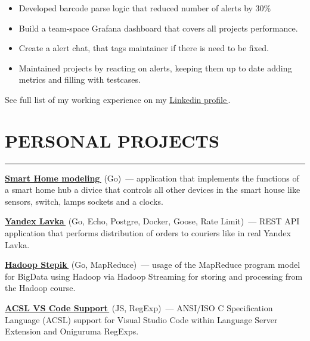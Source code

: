 \documentclass[11pt]{res} %
\let\orighref\href
\renewcommand{\href}[2]{\orighref{#1}{#2\,\faExternalLink}}
\begin{document}
\begin{resume}
        \begin{itemize} \itemsep -2pt
            \item Developed barcode parse logic that reduced number of alerts by 30\%
            \item Build a team-space Grafana dashboard that covers all projects performance.
            \item Create a alert chat, that tags maintainer if there is need to be fixed.  
            \item Maintained projects by reacting on alerts, keeping them up to date adding metrics and filling with testcases.
        \end{itemize}

        See full list of my working experience on my \href{linkedin.com/in/misterzurg/}{Linkedin profile}.


        \section{\uppercase{Personal Projects}}
        \begin{spacing}{0.3}
            \textcolor[RGB]{220,220,220}{\rule{\linewidth}{0.4pt}}
        \end{spacing}
        \textbf{\href{https://github.com/MisterZurg/edu_tinkoff_Backend-Academy-2023/tree/dungeon-master/Go-laguage-part}{Smart Home modeling}} (Go)~--- application that implements the functions of a smart home hub a divice that controls all other devices in the smart house like sensors, switch, lamps sockets and a clocks.
        
        \textbf{\href{https://github.com/MisterZurg/academy_yandex_Backend-School-2023/tree/master/product}{Yandex Lavka}} (Go, Echo, Postgre, Docker, Goose, Rate Limit)~--- REST API application that performs distribution of orders to couriers like in real Yandex Lavka.
        
        \textbf{\href{https://github.com/MisterZurg/stepik_VK_Hadoop}{Hadoop Stepik}} (Go, MapReduce)~--- usage of the MapReduce program model for BigData using Hadoop via Hadoop Streaming for storing and processing from the Hadoop course.
        
         \textbf{\href{https://marketplace.visualstudio.com/items?itemName=misterzurg.acsl-ansi-iso-c-specification-language}{ACSL VS Code Support}} (JS, RegExp)~--- ANSI/ISO C Specification Language (ACSL) support for Visual Studio Code within Language Server Extension and Oniguruma RegExps.


\end{resume}
\end{document}
